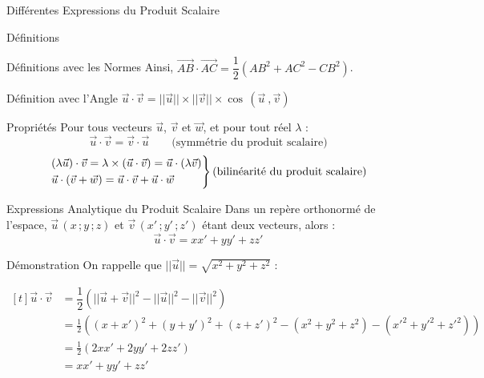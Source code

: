 \documentclass{cours}
\begin{document}
\begin{Gpartie}{Différentes Expressions du Produit Scalaire}
\begin{Spartie}{Définitions}
\begin{SSpartie}{Définitions avec les Normes}
                Ainsi, $\overrightarrow{AB}\cdot\overrightarrow{AC}=\dfrac{1}{2}\left(AB^2+AC^2-CB^2\right)$.
            \end{SSpartie}
            \begin{SSpartie}{Définition avec l'Angle} 
                $\vec{u}\cdot\vec{v}=\lvert\lvert\vec{u}\rvert\rvert\times\lvert\lvert\vec{v}\rvert\rvert\times\cos\,\left(\vec{u}~,\vec{v}\right)$
            \end{SSpartie}
        \end{Spartie}
        \begin{Spartie}{Propriétés} 
            Pour tous vecteurs $\vec{u}$, $\vec{v}$ et $\vec{w}$, et pour tout réel $\lambda$ : \[\vec{u}\cdot\vec{v}=\vec{v}\cdot\vec{u}\qquad\text{(symmétrie du produit scalaire)}\] \[\begin{drcases}\left(\lambda\vec{u}\right)\cdot\vec{v}=\lambda\times\left(\vec{u}\cdot\vec{v}\right)=\vec{u}\cdot\left(\lambda\vec{v}\right) \\ \vec{u}\cdot\left(\vec{v}+\vec{w}\right)=\vec{u}\cdot\vec{v}+\vec{u}\cdot\vec{w}\end{drcases}\text{(bilinéarité du produit scalaire)}\]
        \end{Spartie}
        \begin{Spartie}{Expressions Analytique du Produit Scalaire} 
            Dans un repère orthonormé de l'espace, $\vec{u}\,\left(x\,; y\,; z\right)$ et $\vec{v}\,\left(x'\,; y'\,; z'\right)$ étant deux vecteurs, alors : \[\vec{u}\cdot\vec{v}=xx'+yy'+zz'\] 
            \begin{SSpartie}{Démonstration} 
                On rappelle que $\lvert\lvert\vec{u}\rvert\rvert=\sqrt{x^2+y^2+z^2}$ :

                $\begin{aligned}[t]
                    \vec{u}\cdot\vec{v}&=\dfrac{1}{2}\left(\lvert\lvert\vec{u}+\vec{v}\rvert\rvert^2-\lvert\lvert\vec{u}\rvert\rvert^2-\lvert\lvert\vec{v}\rvert\rvert^2\right) \\
                    &=\frac{1}{2}\left(\left(x+x'\right)^2+\left(y+y'\right)^2+\left(z+z'\right)^2-\left(x^2+y^2+z^2\right)-\left(x'^2+y'^2+z'^2\right)\right) \\
                    &=\frac{1}{2}\left(2xx'+2yy'+2zz'\right) \\
                    &=xx'+y y'+z z'
                \end{aligned}$
            \end{SSpartie}
        \end{Spartie}
    \end{Gpartie}
\end{document}
